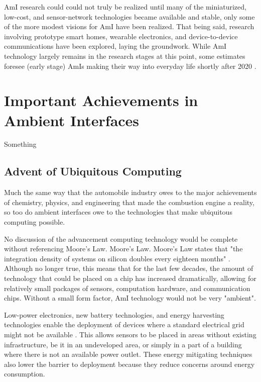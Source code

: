\documentclass{article}
\begin{document}
AmI research could could not truly be realized until many of the miniaturized, low-cost, and sensor-network technologies became available and stable, only some of the more modest visions for AmI have been realized. That being said, research involving prototype smart homes, wearable electronics, and device-to-device communications have been explored, laying the groundwork. While AmI technology largely remains in the research stages at this point, some estimates foresee (early stage) AmIs making their way into everyday life shortly after 2020 \cite{Sadri:2011:AIS:1978802.1978815}.

%
%
\section{Important Achievements in Ambient Interfaces}
Something \cite{Cook2009277}

%
\subsection{Advent of Ubiquitous Computing}
Much the same way that the automobile industry owes to the major achievements of chemistry, physics, and engineering that made the combustion engine a reality, so too do ambient interfaces owe to the technologies that make ubiquitous computing possible.

No discussion of the advancement computing technology would be complete without referencing Moore's Law. Moore's Law. Moore's Law states that "the integration density of systems on silicon doubles every eighteen months" \cite{Aarts:2009:NRP:1735821.1735822}. Although no longer true, this means that for the last few decades, the amount of technology that could be placed on a chip has increased dramatically, allowing for relatively small packages of sensors, computation hardware, and communication chips\cite{Aarts:2009:NRP:1735821.1735822}. Without a small form factor, AmI technology would not be very "ambient".

Low-power electronics, new battery technologies, and energy harvesting technologies enable the deployment of devices where a standard electrical grid might not be available \cite{5475111}. This allows sensors to be placed in areas without existing infrastructure, be it in an undeveloped area, or simply in a part of a building where there is not an available power outlet. These energy mitigating techniques also lower the barrier to deployment because they reduce concerns around energy consumption.
\end{document}
